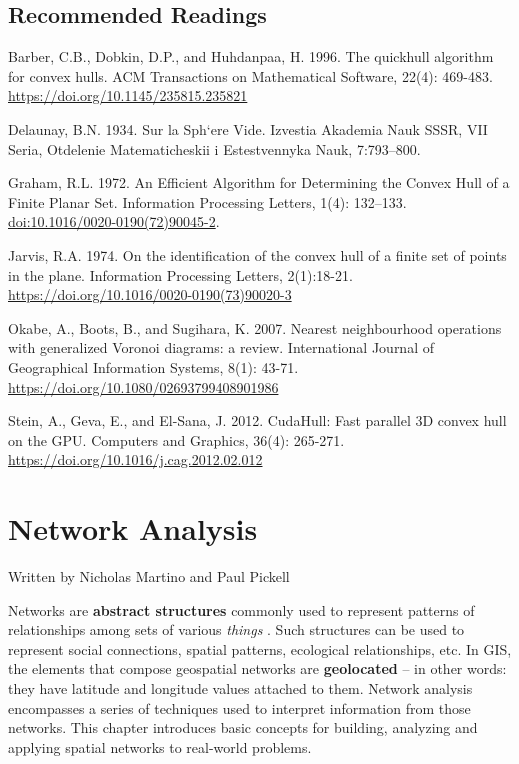 \documentclass[
]{book}
\begin{document}
\hypertarget{recommended-readings}{%
\section*{Recommended Readings}\label{recommended-readings}}

Barber, C.B., Dobkin, D.P., and Huhdanpaa, H. 1996. The quickhull algorithm for convex hulls. ACM Transactions on Mathematical Software, 22(4): 469-483. \url{https://doi.org/10.1145/235815.235821}

Delaunay, B.N. 1934. Sur la Sph`ere Vide. Izvestia Akademia Nauk SSSR, VII Seria, Otdelenie
Matematicheskii i Estestvennyka Nauk, 7:793--800.

Graham, R.L. 1972. An Efficient Algorithm for Determining the Convex Hull of a Finite Planar Set. Information Processing Letters, 1(4): 132--133. \url{doi:10.1016/0020-0190(72)90045-2}.

Jarvis, R.A. 1974. On the identification of the convex hull of a finite set of points in the plane. Information Processing Letters, 2(1):18-21. \url{https://doi.org/10.1016/0020-0190(73)90020-3}

Okabe, A., Boots, B., and Sugihara, K. 2007. Nearest neighbourhood operations with generalized Voronoi diagrams: a review. International Journal of Geographical Information Systems, 8(1): 43-71. \url{https://doi.org/10.1080/02693799408901986}

Stein, A., Geva, E., and El-Sana, J. 2012. CudaHull: Fast parallel 3D convex hull on the GPU. Computers and Graphics, 36(4): 265-271. \url{https://doi.org/10.1016/j.cag.2012.02.012}

\hypertarget{network-analysis}{%
\chapter{Network Analysis}\label{network-analysis}}

Written by
Nicholas Martino and Paul Pickell

Networks are \textbf{abstract structures} commonly used to represent patterns of relationships among sets of various \emph{things} \citep{ajorlou_introduction_2018}. Such structures can be used to represent social connections, spatial patterns, ecological relationships, etc. In GIS, the elements that compose geospatial networks are \textbf{geolocated} -- in other words: they have latitude and longitude values attached to them. Network analysis encompasses a series of techniques used to interpret information from those networks. This chapter introduces basic concepts for building, analyzing and applying spatial networks to real-world problems.
\end{document}
